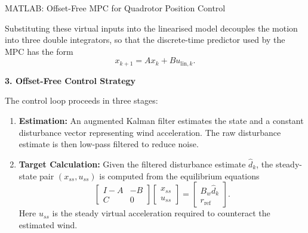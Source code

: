 \begin{examplebox}{MATLAB: Offset-Free MPC for Quadrotor Position Control}
\begin{center}
		
		\label{fig:quadrotor_control_architecture}
	\end{center}

	Substituting these virtual inputs into the linearised model decouples the motion into three double integrators, so that the discrete-time predictor used by the MPC has the form
	\[
	x_{k+1} = A x_k + B u_{\mathrm{lin},k}.
	\]
	
	\textbf{3. Offset-Free Control Strategy}
	
	The control loop proceeds in three stages:
	\begin{enumerate}
		\item \textbf{Estimation:} An augmented Kalman filter estimates the state and a constant disturbance vector representing wind acceleration. The raw disturbance estimate is then low-pass filtered to reduce noise.
		
		\item \textbf{Target Calculation:} Given the filtered disturbance estimate \(\hat d_k\), the steady-state pair \((x_{ss},u_{ss})\) is computed from the equilibrium equations
		\[
		\begin{bmatrix}
			I-A & -B\\
			C & 0
		\end{bmatrix}
		\begin{bmatrix}
			x_{ss}\\
			u_{ss}
		\end{bmatrix}
		=
		\begin{bmatrix}
			B_w \hat d_k\\
			r_{\mathrm{ref}}
		\end{bmatrix}.
		\]
		Here \(u_{ss}\) is the steady virtual acceleration required to counteract the estimated wind.
		

\end{enumerate}
\end{examplebox}
